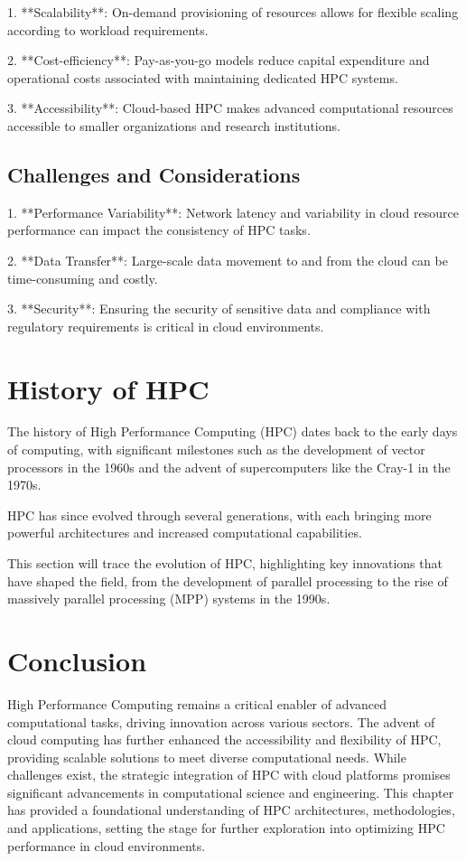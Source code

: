 1. **Scalability**: On-demand provisioning of resources allows for flexible scaling according to workload requirements.

2. **Cost-efficiency**: Pay-as-you-go models reduce capital expenditure and operational costs associated with maintaining dedicated HPC systems.

3. **Accessibility**: Cloud-based HPC makes advanced computational resources accessible to smaller organizations and research institutions.

\subsection{Challenges and Considerations}

1. **Performance Variability**: Network latency and variability in cloud resource performance can impact the consistency of HPC tasks.

2. **Data Transfer**: Large-scale data movement to and from the cloud can be time-consuming and costly.

3. **Security**: Ensuring the security of sensitive data and compliance with regulatory requirements is critical in cloud environments.

\section{History of HPC}
The history of High Performance Computing (HPC) dates back to the early days of computing, with significant milestones such as the development of vector processors in the 1960s and the advent of supercomputers like the Cray-1 in the 1970s. 

HPC has since evolved through several generations, with each bringing more powerful architectures and increased computational capabilities. 

This section will trace the evolution of HPC, highlighting key innovations that have shaped the field, from the development of parallel processing to the rise of massively parallel processing (MPP) systems in the 1990s.

\section{Conclusion}

High Performance Computing remains a critical enabler of advanced computational tasks, driving innovation across various sectors. The advent of cloud computing has further enhanced the accessibility and flexibility of HPC, providing scalable solutions to meet diverse computational needs. While challenges exist, the strategic integration of HPC with cloud platforms promises significant advancements in computational science and engineering. This chapter has provided a foundational understanding of HPC architectures, methodologies, and applications, setting the stage for further exploration into optimizing HPC performance in cloud environments.
